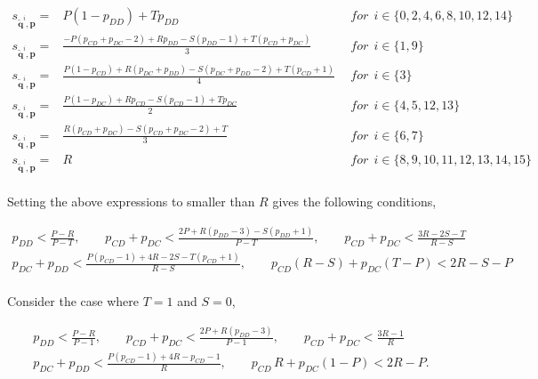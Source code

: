 \documentclass{article}
\theoremstyle{definition}
\begin{document}
\begin{equation*}
  \begin{array}{lcl}
  s_{\mathbf{\tilde{q}}^{i}, \mathbf{p}} = & P (1 - p_{DD}) + T p_{DD} & ~~for~~ i \in \{0, 2, 4, 6, 8, 10, 12, 14\} \\ [0.3cm]
  s_{\mathbf{\tilde{q}}^{i}, \mathbf{p}} = & \frac{-P(p_{CD} + p_{DC} - 2) + Rp_{DD} - S(p_{DD} - 1) + T(p_{CD} + p_{DC})}{3} & ~~for~~ i \in \{1, 9\} \\ [0.3cm]
  s_{\mathbf{\tilde{q}}^{i}, \mathbf{p}} = & \frac{P(1 - p_{CD}) + R(p_{DC} + p_{DD}) - S(p_{DC} + p_{DD} - 2) + T(p_{CD} + 1)}{4} & ~~for~~ i \in \{3\} \\ [0.3cm]
  s_{\mathbf{\tilde{q}}^{i}, \mathbf{p}} = & \frac{P(1 - p_{DC}) + Rp_{CD} - S(p_{CD} - 1) + Tp_{DC}}{2} & ~~for~~ i \in \{4, 5, 12, 13\} \\ [0.3cm]
  s_{\mathbf{\tilde{q}}^{i}, \mathbf{p}} = & \frac{R(p_{CD} + p_{DC}) - S(p_{CD} + p_{DC} - 2) + T}{3} & ~~for~~ i \in \{6, 7\} \\ [0.3cm]
  s_{\mathbf{\tilde{q}}^{i}, \mathbf{p}} = & R & ~~for~~ i \in \{8, 9, 10, 11, 12, 13, 14, 15\} \\ [0.3cm]
\end{array}
\end{equation*}

Setting the above expressions to smaller than $R$ gives the following conditions,

\normalsize{
\begin{equation*}
  \begin{array}{c}
  p_{DD} < \frac{P - R}{P - T}, 
  \qquad p_{CD} + p_{DC} < \frac{2 P + R (p_{DD} - 3) - S (p_{DD} + 1)}{P - T},
  \qquad p_{CD} + p_{DC} < \frac{3 R - 2 S - T}{R - S} \\ [0.4cm]
  p_{DC} + p_{DD} < \frac{P \left(p_{CD} - 1\right) + 4 R - 2 S - T \left(p_{CD} + 1\right)}{R - S},
  \qquad p_{CD} \left(R - S\right) + p_{DC} \left(T - P\right) < 2 R - S - P \\
\end{array}
\end{equation*}}

Consider the case where $T=1$ and $S=0$,

\begin{equation*}
  \begin{array}{c}
  p_{DD} < \frac{P - R}{P - 1},
  \qquad p_{CD} + p_{DC} < \frac{2 P + R (p_{DD} - 3)}{P - 1},
  \qquad p_{CD} + p_{DC} < \frac{3 R - 1}{R} \\ [0.4cm]
  p_{DC} + p_{DD} < \frac{P \left(p_{CD} - 1\right) + 4 R - p_{CD} - 1}{R},
  \qquad p_{CD} \, R + p_{DC} \left(1 - P\right) < 2 R  - P.
\end{array}
\end{equation*}
\end{document}
